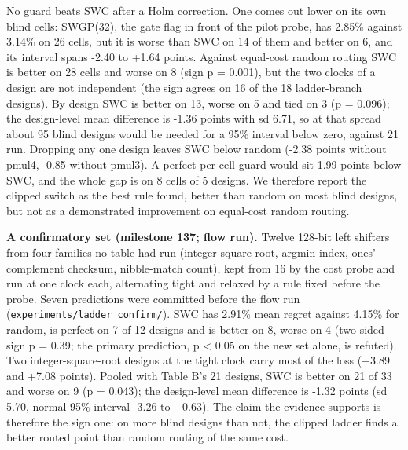 \documentclass[conference]{IEEEtran}
\begin{document}
No guard beats SWC after a Holm correction. One comes out lower on its
own blind cells: SWGP(32), the gate flag in front of the pilot probe,
has 2.85\% against 3.14\% on 26 cells, but it is worse than SWC on 14 of
them and better on 6, and its interval spans -2.40 to +1.64 points.
Against equal-cost random routing SWC is better on 28 cells and worse on
8 (sign p = 0.001), but the two clocks of a design are not independent
(the sign agrees on 16 of the 18 ladder-branch designs). By design SWC
is better on 13, worse on 5 and tied on 3 (p = 0.096); the design-level
mean difference is -1.36 points with sd 6.71, so at that spread about 95
blind designs would be needed for a 95\% interval below zero, against 21
run. Dropping any one design leaves SWC below random (-2.38 points
without pmul4, -0.85 without pmul3). A perfect per-cell guard would sit
1.99 points below SWC, and the whole gap is on 8 cells of 5 designs. We
therefore report the clipped switch as the best rule found, better than
random on most blind designs, but not as a demonstrated improvement on
equal-cost random routing.

\textbf{A confirmatory set (milestone 137; flow run).} Twelve 128-bit
left shifters from four families no table had run (integer square root,
argmin index, ones'-complement checksum, nibble-match count), kept from
16 by the cost probe and run at one clock each, alternating tight and
relaxed by a rule fixed before the probe. Seven predictions were
committed before the flow run (\texttt{experiments/\allowbreak{}ladder\_\allowbreak{}confirm/\allowbreak{}}).
SWC has 2.91\% mean regret against 4.15\% for random, is perfect on 7 of
12 designs and is better on 8, worse on 4 (two-sided sign p = 0.39; the
primary prediction, p \textless{} 0.05 on the new set alone, is
refuted). Two integer-square-root designs at the tight clock carry most
of the loss (+3.89 and +7.08 points). Pooled with Table B's 21 designs,
SWC is better on 21 of 33 and worse on 9 (p = 0.043); the design-level
mean difference is -1.32 points (sd 5.70, normal 95\% interval -3.26 to
+0.63). The claim the evidence supports is therefore the sign one: on
more blind designs than not, the clipped ladder finds a better routed
point than random routing of the same cost.
\end{document}
